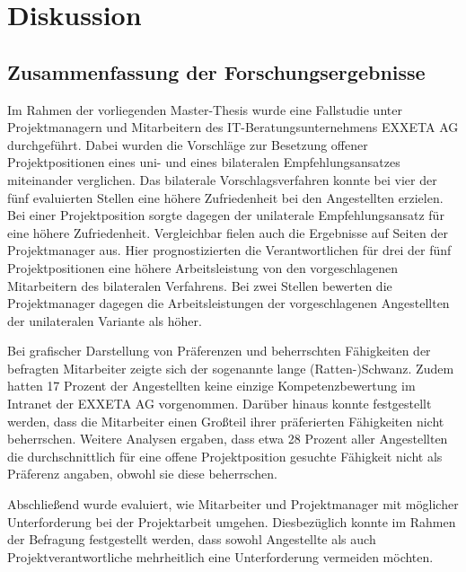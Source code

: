 \chapter{Diskussion}
\label{ch:diskussion}

\section{Zusammenfassung der Forschungsergebnisse}
\label{ch:diskussion:zusammenfassung}
Im Rahmen der vorliegenden Master-Thesis wurde eine Fallstudie unter Projektmanagern und Mitarbeitern des IT-Beratungsunternehmens EXXETA AG durchgeführt. Dabei wurden die Vorschläge zur Besetzung offener Projektpositionen eines uni- und eines bilateralen Empfehlungsansatzes miteinander verglichen. Das bilaterale Vorschlagsverfahren konnte bei vier der fünf evaluierten Stellen eine höhere Zufriedenheit bei den Angestellten erzielen. Bei einer Projektposition sorgte dagegen der unilaterale Empfehlungsansatz für eine höhere Zufriedenheit. Vergleichbar fielen auch die Ergebnisse auf Seiten der Projektmanager aus. Hier prognostizierten die Verantwortlichen für drei der fünf Projektpositionen eine höhere Arbeitsleistung von den vorgeschlagenen Mitarbeitern des bilateralen Verfahrens. Bei zwei Stellen bewerten die Projektmanager dagegen die Arbeitsleistungen der vorgeschlagenen Angestellten der unilateralen Variante als höher.

Bei grafischer Darstellung von Präferenzen und beherrschten Fähigkeiten der befragten Mitarbeiter zeigte sich der sogenannte lange (Ratten-)Schwanz. Zudem hatten 17 Prozent der Angestellten keine einzige Kompetenzbewertung im Intranet der EXXETA AG vorgenommen. Darüber hinaus konnte festgestellt werden, dass die Mitarbeiter einen Großteil ihrer präferierten Fähigkeiten nicht beherrschen. Weitere Analysen ergaben, dass etwa 28 Prozent aller Angestellten die durchschnittlich für eine offene Projektposition gesuchte Fähigkeit nicht als Präferenz angaben, obwohl sie diese beherrschen. 

Abschließend wurde evaluiert, wie Mitarbeiter und Projektmanager mit möglicher Unterforderung bei der Projektarbeit umgehen. Diesbezüglich konnte im Rahmen der Befragung festgestellt werden, dass sowohl Angestellte als auch Projektverantwortliche mehrheitlich eine Unterforderung vermeiden möchten.

